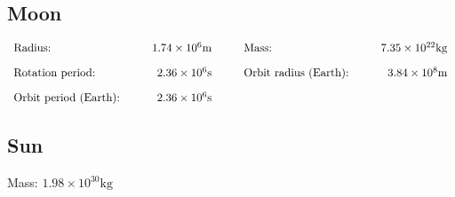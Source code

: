 \documentclass[12pt,a4paper]{article}
\begin{document}
\subsection{Moon}
\begin{align*}
  \begin{array}{l@{\hspace{1cm}}r@{\hspace{1cm}}l@{\hspace{1cm}}r}
    \text{Radius:} & 1.74 \times 10^6 \mathrm{m} & \text{Mass:} & 7.35 \times 10^{22} \mathrm{kg} \\[1em]
    \text{Rotation period:} & 2.36 \times 10^6 \mathrm{s} & \text{Orbit radius (Earth):} & 3.84 \times 10^8 \mathrm{m} \\[1em]
    \text{Orbit period (Earth):} & 2.36 \times 10^6 \mathrm{s} & &
  \end{array}
\end{align*}

\subsection{Sun}
Mass: $1.98 \times 10^{30} \mathrm{kg}$
\end{document}
